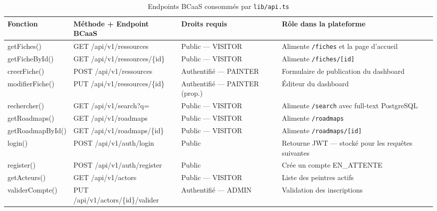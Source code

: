 \documentclass[12pt,a4paper]{report}
\begin{document}
\begin{table}[H]
\centering
\renewcommand{\arraystretch}{1.3}
\small
\begin{tabularx}{\textwidth}{>{\ttfamily\footnotesize}l
                              >{\footnotesize}X
                              >{\footnotesize}l
                              >{\footnotesize}X}
\toprule
\normalfont\textbf{Fonction} &
\textbf{Méthode + Endpoint BCaaS} &
\textbf{Droits requis} &
\textbf{Rôle dans la plateforme} \\
\midrule
getFiches()      & GET /api/v1/ressources          & Public — VISITOR              & Alimente \texttt{/fiches} et la page d'accueil \\
getFicheById()   & GET /api/v1/ressources/\{id\}   & Public — VISITOR              & Alimente \texttt{/fiches/[id]} \\
creerFiche()     & POST /api/v1/ressources         & Authentifié — PAINTER         & Formulaire de publication du dashboard \\
modifierFiche()  & PUT /api/v1/ressources/\{id\}   & Authentifié — PAINTER (prop.) & Éditeur du dashboard \\
rechercher()     & GET /api/v1/search?q=           & Public — VISITOR              & Alimente \texttt{/search} avec full-text PostgreSQL \\
getRoadmaps()    & GET /api/v1/roadmaps            & Public — VISITOR              & Alimente \texttt{/roadmaps} \\
getRoadmapById() & GET /api/v1/roadmaps/\{id\}     & Public — VISITOR              & Alimente \texttt{/roadmaps/[id]} \\
login()          & POST /api/v1/auth/login         & Public                        & Retourne JWT --- stocké pour les requêtes suivantes \\
register()       & POST /api/v1/auth/register      & Public                        & Crée un compte EN\_ATTENTE \\
getActeurs()     & GET /api/v1/actors              & Public — VISITOR              & Liste des peintres actifs \\
validerCompte()  & PUT /api/v1/actors/\{id\}/valider & Authentifié — ADMIN         & Validation des inscriptions \\
\bottomrule
\end{tabularx}
\caption{Endpoints BCaaS consommés par \texttt{lib/api.ts}}
\end{table}

\end{document}
